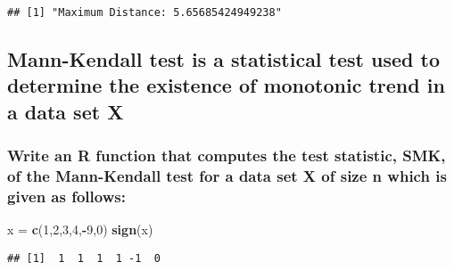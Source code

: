 \documentclass[
]{article}
\newenvironment{Shaded}{\begin{snugshade}}{\end{snugshade}}
\newcommand{\DecValTok}[1]{\textcolor[rgb]{0.00,0.00,0.81}{#1}}
\newcommand{\FunctionTok}[1]{\textcolor[rgb]{0.13,0.29,0.53}{\textbf{#1}}}
\newcommand{\NormalTok}[1]{#1}
\newcommand{\OtherTok}[1]{\textcolor[rgb]{0.56,0.35,0.01}{#1}}
\newcommand{\SpecialCharTok}[1]{\textcolor[rgb]{0.81,0.36,0.00}{\textbf{#1}}}
\begin{document}
\begin{verbatim}
## [1] "Maximum Distance: 5.65685424949238"
\end{verbatim}

\subsection{Mann-Kendall test is a statistical test used to determine
the existence of monotonic trend in a data set
X}\label{mann-kendall-test-is-a-statistical-test-used-to-determine-the-existence-of-monotonic-trend-in-a-data-set-x}

\subsubsection{Write an R function that computes the test statistic,
SMK, of the Mann-Kendall test for a data set X of size n which is given
as
follows:}\label{write-an-r-function-that-computes-the-test-statistic-smk-of-the-mann-kendall-test-for-a-data-set-x-of-size-n-which-is-given-as-follows}

\begin{Shaded}
\begin{Highlighting}[]
\NormalTok{x }\OtherTok{=} \FunctionTok{c}\NormalTok{(}\DecValTok{1}\NormalTok{,}\DecValTok{2}\NormalTok{,}\DecValTok{3}\NormalTok{,}\DecValTok{4}\NormalTok{,}\SpecialCharTok{{-}}\DecValTok{9}\NormalTok{,}\DecValTok{0}\NormalTok{)}
\FunctionTok{sign}\NormalTok{(x)}
\end{Highlighting}
\end{Shaded}

\begin{verbatim}
## [1]  1  1  1  1 -1  0
\end{verbatim}
\end{document}
